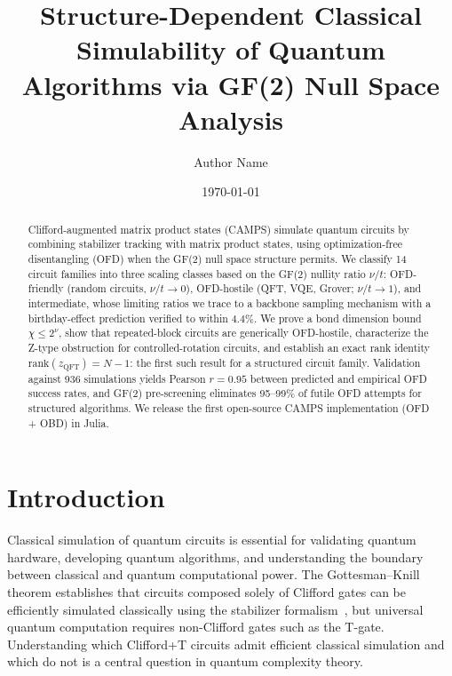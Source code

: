\documentclass[a4paper,twocolumn,11pt]{quantumarticle}
\begin{document}
\title{Structure-Dependent Classical Simulability of Quantum Algorithms via GF(2) Null Space Analysis}

\author{Author Name}



\date{\today}

\maketitle

\begin{abstract}

Clifford-augmented matrix product states (CAMPS) simulate quantum circuits by combining stabilizer tracking with matrix product states, using optimization-free disentangling (OFD) when the GF(2) null space structure permits.
We classify 14 circuit families into three scaling classes based on the GF(2) nullity ratio $\nu/t$: OFD-friendly (random circuits, $\nu/t \to 0$), OFD-hostile (QFT, VQE, Grover; $\nu/t \to 1$), and intermediate, whose limiting ratios we trace to a backbone sampling mechanism with a birthday-effect prediction verified to within $4.4\%$.
We prove a bond dimension bound $\chi \le 2^\nu$, show that repeated-block circuits are generically OFD-hostile, characterize the Z-type obstruction for controlled-rotation circuits, and establish an exact rank identity $\mathrm{rank}(z_{\mathrm{QFT}}) = N - 1$: the first such result for a structured circuit family.
Validation against 936 simulations yields Pearson $r = 0.95$ between predicted and empirical OFD success rates, and GF(2) pre-screening eliminates 95--99\% of futile OFD attempts for structured algorithms.
We release the first open-source CAMPS implementation (OFD + OBD) in Julia.
\end{abstract}

\section{Introduction}
\label{sec:intro}

Classical simulation of quantum circuits is essential for validating quantum hardware, developing quantum algorithms, and understanding the boundary between classical and quantum computational power.
The Gottesman--Knill theorem establishes that circuits composed solely of Clifford gates can be efficiently simulated classically using the stabilizer formalism~\cite{Gottesman1998,Aaronson2004}, but universal quantum computation requires non-Clifford gates such as the T-gate.
Understanding which Clifford+T circuits admit efficient classical simulation and which do not is a central question in quantum complexity theory.
\end{document}
